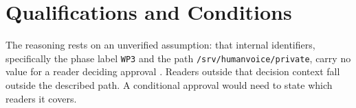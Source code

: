 \section{Qualifications and Conditions}

The reasoning rests on an unverified assumption: that internal identifiers, specifically the phase label \texttt{WP3} and the path \texttt{/srv/humanvoice/private}, carry no value for a reader deciding approval \cite{source001}. Readers outside that decision context fall outside the described path. A conditional approval would need to state which readers it covers.